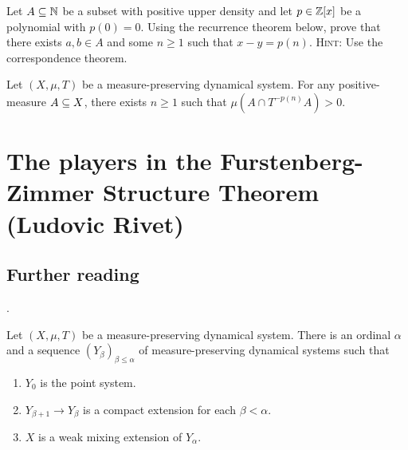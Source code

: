 \documentclass[reqno, twoside]{article}
\begin{document}
    \begin{exercise}
        Let $A\subseteq\mathbb{N}$ be a subset with positive upper density and let $p\in\mathbb{Z}[x]$ be a polynomial with $p(0)=0$. Using the recurrence theorem below, prove that there exists $a,b\in A$ and some $n\geq1$ such that $x-y=p(n)$. \textsc{Hint:} Use the correspondence theorem.
        \begin{center}
            \begin{minipage}{0.95\textwidth}
                \begin{theorem}
                    Let $(X,\mu,T)$ be a measure-preserving dynamical system. For any positive-measure $A\subseteq X$, there exists $n\geq1$ such that $\mu(A\cap T^{-p(n)}A)>0$.
                \end{theorem}
            \end{minipage}
        \end{center}
    \end{exercise}

    \section{The players in the Furstenberg-Zimmer Structure Theorem (Ludovic Rivet)}\label{sec:7}


    {\vspace{-0.1in}\small\subsection*{Further reading}\TODO.}

    \begin{theorem}
        Let $(X,\mu,T)$ be a measure-preserving dynamical system. There is an ordinal $\alpha$ and a sequence $(Y_\beta)_{\beta\leq\alpha}$ of measure-preserving dynamical systems such that
        \begin{enumerate}
            \item $Y_0$ is the point system.
                \vspace{-0.05in}
            \item $Y_{\beta+1}\to Y_\beta$ is a compact extension for each $\beta<\alpha$.
                \vspace{-0.05in}
            \item $X$ is a weak mixing extension of $Y_\alpha$.
        \end{enumerate}
    \end{theorem}
\end{document}
